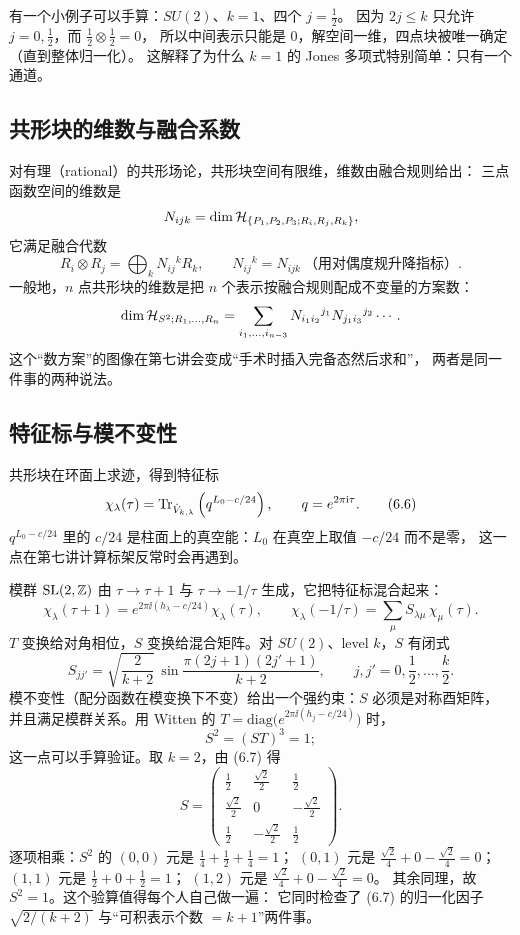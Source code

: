 有一个小例子可以手算：$SU(2)$、$k=1$、四个 $j=\frac12$。
因为 $2j\le k$ 只允许 $j=0,\frac12$，而 $\frac12\otimes\frac12=0$，
所以中间表示只能是 $0$，解空间一维，四点块被唯一确定（直到整体归一化）。
这解释了为什么 $k=1$ 的 Jones 多项式特别简单：只有一个通道。

\subsection{共形块的维数与融合系数}

对有理（rational）的共形场论，共形块空间有限维，维数由融合规则给出：
三点函数空间的维数是
\[
N_{ijk}=\dim\mathcal{H}_{\{P_1,P_2,P_3;R_i,R_j,R_k\}},
\]
它满足融合代数
\[
R_i\otimes R_j=\bigoplus_k N_{ij}{}^kR_k ,
\qquad N_{ij}{}^k=N_{ijk}\ \text{（用对偶度规升降指标）}.
\]
一般地，$n$ 点共形块的维数是把 $n$ 个表示按融合规则配成不变量的方案数：
\[
\dim\mathcal{H}_{S^2;R_1,\dots,R_n}
=\sum_{i_1,\dots,i_{n-3}}
N_{i_1 i_2}{}^{j_1}N_{j_1 i_3}{}^{j_2}\cdots .
\]
这个“数方案”的图像在第七讲会变成“手术时插入完备态然后求和”，
两者是同一件事的两种说法。

\subsection{特征标与模不变性}

共形块在环面上求迹，得到特征标
\begin{equation}
\chi_\lambda(\tau)=\operatorname{Tr}_{\hat V_{k,\lambda}}\left(q^{L_0-c/24}\right),
\qquad q=e^{2\pi\mathrm{i}\tau}. \tag{6.6}
\end{equation}
$q^{L_0-c/24}$ 里的 $c/24$ 是柱面上的真空能：$L_0$ 在真空上取值 $-c/24$ 而不是零，
这一点在第七讲计算标架反常时会再遇到。

模群 $\mathrm{SL}(2,\mathbb{Z})$ 由 $\tau\to\tau+1$ 与 $\tau\to-1/\tau$ 生成，它把特征标混合起来：
\[
\chi_\lambda(\tau+1)=e^{2\pi\ii(h_\lambda-c/24)}\chi_\lambda(\tau),
\qquad
\chi_\lambda(-1/\tau)=\sum_\mu S_{\lambda\mu}\,\chi_\mu(\tau).
\]
$T$ 变换给对角相位，$S$ 变换给混合矩阵。对 $SU(2)$、level $k$，$S$ 有闭式
\begin{equation}
S_{jj'}=\sqrt{\frac{2}{k+2}}\,\sin\frac{\pi(2j+1)(2j'+1)}{k+2},
\qquad j,j'=0,\frac12,\dots,\frac k2 . \tag{6.7}
\end{equation}
模不变性（配分函数在模变换下不变）给出一个强约束：$S$ 必须是对称酉矩阵，
并且满足模群关系。用 Witten 的 $T=\mathrm{diag}\big(e^{2\pi\ii(h_j-c/24)}\big)$ 时，
\begin{equation}
S^2=(ST)^3=1 ; \tag{6.8}
\end{equation}
这一点可以手算验证。取 $k=2$，由 (6.7) 得
\[
S=\begin{pmatrix}
\frac12 & \frac{\sqrt2}{2} & \frac12\\[3pt]
\frac{\sqrt2}{2} & 0 & -\frac{\sqrt2}{2}\\[3pt]
\frac12 & -\frac{\sqrt2}{2} & \frac12
\end{pmatrix}.
\]
逐项相乘：$S^2$ 的 $(0,0)$ 元是 $\frac14+\frac12+\frac14=1$；
$(0,1)$ 元是 $\frac{\sqrt2}{4}+0-\frac{\sqrt2}{4}=0$；
$(1,1)$ 元是 $\frac12+0+\frac12=1$；
$(1,2)$ 元是 $\frac{\sqrt2}{4}+0-\frac{\sqrt2}{4}=0$。
其余同理，故 $S^2=1$。这个验算值得每个人自己做一遍：
它同时检查了 (6.7) 的归一化因子 $\sqrt{2/(k+2)}$ 与“可积表示个数 $=k+1$”两件事。


